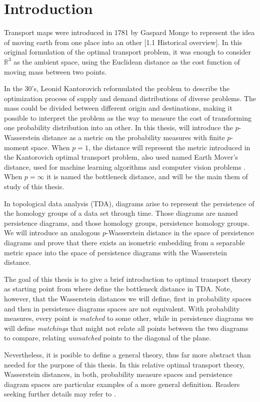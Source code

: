 \section{Introduction}

Transport maps were introduced in 1781 by Gaspard Monge to represent the idea of moving earth from one place into an other \cite{Figalli}[1.1 Historical overview]. In this original formulation of the optimal transport problem, it was enough to consider $ \mathbb R^3 $ as the ambient space, using the Euclidean distance as the cost function of moving mass between two points.

In the 30's, Leonid Kantorovich reformulated the problem to describe the optimization process of supply and demand distributions of diverse problems. The mass could be divided between different origin and destinations, making it possible to interpret the problem as the way to measure the cost of transforming one probability distribution into an other. In this thesis, will introduce the $p$-Wasserstein distance as a metric on the probability measures with finite $p$-moment space. When $ p = 1 $, the distance will represent the metric introduced in the Kantorovich optimal transport problem, also used named Earth Mover's distance, used for machine learning algorithms and computer vision problems \cite{earth}. When $p = \infty $ it is named the bottleneck distance, and will be the main them of study of this thesis.

In topological data analysis (TDA), diagrams arise to represent the persistence of the homology groups of a data set through time. Those diagrams are named persistence diagrams, and those homology groups, persistence homology groups. We will introduce an analogous $p$-Wasserstein distance in the space of persistence diagrams and prove that there exists an isometric embedding  from a separable metric space into the space of persistence diagrams with the Wasserstein distance.

The goal of this thesis is to give a brief introduction to optimal transport theory as starting point from where define the bottleneck distance in TDA. Note, however, that the Wasserstein distances we will define, first in probability spaces and then in persistence diagrams spaces are not equivalent. With probability measures, every point is {\it matched} to some other, while in persistence diagrams we will define {\it matchings} that might not relate all points between the two diagrams to compare, relating {\it unmatched} points to the diagonal of the plane.

Nevertheless, it is posible to define a general theory, thus far more abstract than needed for the purpose of this thesis. In this relative optimal transport theory, Wasserstein distances, in both, probability measure spaces and persistence diagram spaces are particular examples of a more general definition. Readers seeking further details may refer to \cite{Elchesen}.